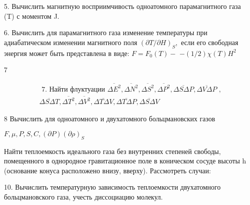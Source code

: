 \documentclass[a4paper,12pt]{article} %
\begin{document}
\begin{task}

5. Вычислить магнитную восприимчивость одноатомного парамагнитного газа (T) с моментом J.


\end{task}


\begin{task}

$6 .$ Вычислить для парамагнитного газа изменение температуры при адиабатическом изменении магнитного поля $(\partial T / \partial H)_{S},$ если его свободная энергия может быть представлена в виде: $F=F_{0}(T)-$ $-(1 / 2) \chi(T) H^{2}$


\end{task}


\begin{task}

7

$$
\begin{aligned}
&\text { 7. Найти флуктуации } \overline{\Delta E^{2}}, \overline{\Delta N^{2}}, \overline{\Delta S^{2}}, \overline{\Delta P^{2}}, \overline{\Delta S \Delta P}, \overline{\Delta V \Delta P} \text { , }\\
&\overline{\Delta S \Delta T}, \overline{\Delta T^{2}}, \overline{\Delta V^{2}}, \overline{\Delta T \Delta V}, \overline{\Delta T \Delta P}, \overline{\Delta S \Delta V}
\end{aligned}$$


\end{task}


\begin{task}

8 Вычислить для одноатомного и двухатомного больцмановских газов 

$ F, \mu, P, S, C,(\partial P)(\partial \rho)_{S}$




\end{task}


\begin{task}

Найти теплоемкость идеального газа без внутренних степеней свободы, помещенного в однородное гравитационное поле в коническом сосуде высоты h (основание конуса расположено внизу, вверху). Рассмотреть случаи:



\end{task}


\begin{task}

10. Вычислить температурную зависимость теплоемкости двухатомного больцмановского газа, учесть диссоциацию молекул. 


\end{task}
\end{document}
